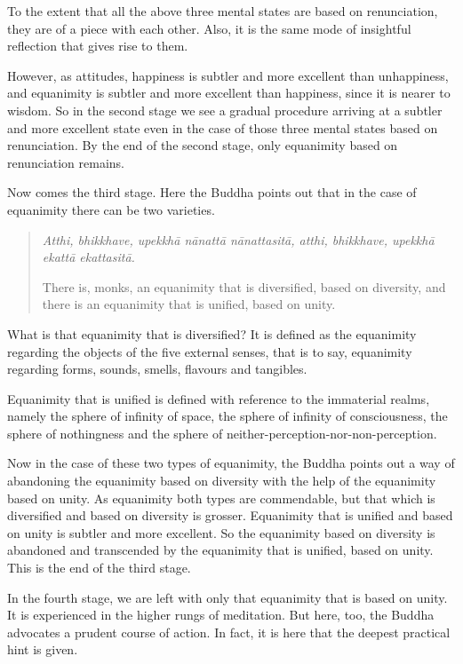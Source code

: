 To the extent that all the above three mental states are based on renunciation, they are of a piece with each other. Also, it is the same mode of insightful reflection that gives rise to them.

However, as attitudes, happiness is subtler and more excellent than unhappiness, and equanimity is subtler and more excellent than happiness, since it is nearer to wisdom. So in the second stage we see a gradual procedure arriving at a subtler and more excellent state even in the case of those three mental states based on renunciation. By the end of the second stage, only equanimity based on renunciation remains.

Now comes the third stage. Here the Buddha points out that in the case of equanimity there can be two varieties.

\begin{quote}
\emph{Atthi, bhikkhave, upekkhā nānattā nānattasitā, atthi, bhikkhave, upekkhā ekattā ekattasitā.}

There is, monks, an equanimity that is diversified, based on diversity, and there is an equanimity that is unified, based on unity.
\end{quote}

What is that equanimity that is diversified? It is defined as the equanimity regarding the objects of the five external senses, that is to say, equanimity regarding forms, sounds, smells, flavours and tangibles.

Equanimity that is unified is defined with reference to the immaterial realms, namely the sphere of infinity of space, the sphere of infinity of consciousness, the sphere of nothingness and the sphere of neither-perception-nor-non-perception.

Now in the case of these two types of equanimity, the Buddha points out a way of abandoning the equanimity based on diversity with the help of the equanimity based on unity. As equanimity both types are commendable, but that which is diversified and based on diversity is grosser. Equanimity that is unified and based on unity is subtler and more excellent. So the equanimity based on diversity is abandoned and transcended by the equanimity that is unified, based on unity. This is the end of the third stage.

In the fourth stage, we are left with only that equanimity that is based on unity. It is experienced in the higher rungs of meditation. But here, too, the Buddha advocates a prudent course of action. In fact, it is here that the deepest practical hint is given.

